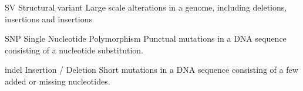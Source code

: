 	{SV}            %
 	{Structural variant}  %
 	{Large scale alterations in a genome, including deletions, insertions and insertions} %

	{SNP}
	{Single Nucleotide Polymorphism}
	{Punctual mutations in a DNA sequence consisting of a nucleotide substitution.}

	{indel}
	{Insertion / Deletion}
	{Short mutations in a DNA sequence consisting of a few added or missing nucleotides.}
